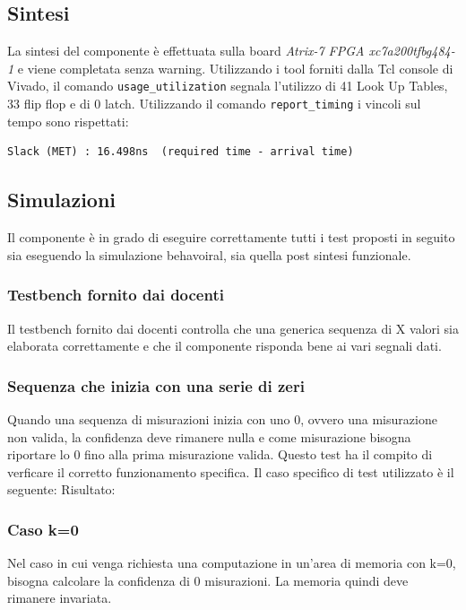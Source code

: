 \documentclass[12pt,a4paper]{scrartcl}
\begin{document}
    \subsection{Sintesi}
    La sintesi del componente è effettuata sulla board \textit{Atrix-7 FPGA xc7a200tfbg484-1} e viene completata senza warning.
    \newline Utilizzando i tool forniti dalla Tcl console di Vivado, il comando \texttt{usage\_utilization} segnala l'utilizzo di 41 Look Up Tables, 33 flip flop e di 0 latch. 
    \newline Utilizzando il comando \texttt{report\_timing} i vincoli sul tempo sono rispettati:
    \begin{lstlisting}
Slack (MET) : 16.498ns  (required time - arrival time)
    \end{lstlisting}
    \subsection{Simulazioni}
    Il componente è in grado di eseguire correttamente tutti i test proposti in seguito sia eseguendo la simulazione behavoiral, sia quella post sintesi funzionale.
    \subsubsection{Testbench fornito dai docenti}
    Il testbench fornito dai docenti controlla che una generica sequenza di X valori sia elaborata correttamente e che il componente risponda bene ai vari segnali dati.
    \subsubsection{Sequenza che inizia con una serie di zeri}
    Quando una sequenza di misurazioni inizia con uno 0, ovvero una misurazione non valida, la confidenza deve rimanere nulla e come misurazione bisogna riportare lo 0 fino alla prima misurazione valida.
    \newline Questo test ha il compito di verficare il corretto funzionamento specifica.
    \newline Il caso specifico di test utilizzato è il seguente:
    \newline [0, 0, 0, 0, 239, 0, 0, 0, 0, 0, 0]
    \newline Risultato:
    \newline [0, 0, 0, 0, 239, 31, 239, 30, 239, 29, 239, 28]
   \subsubsection{Caso k=0}
   Nel caso in cui venga richiesta una computazione in un'area di memoria con k=0, bisogna calcolare la confidenza di 0 misurazioni. La memoria quindi deve rimanere invariata. 
\end{document}
